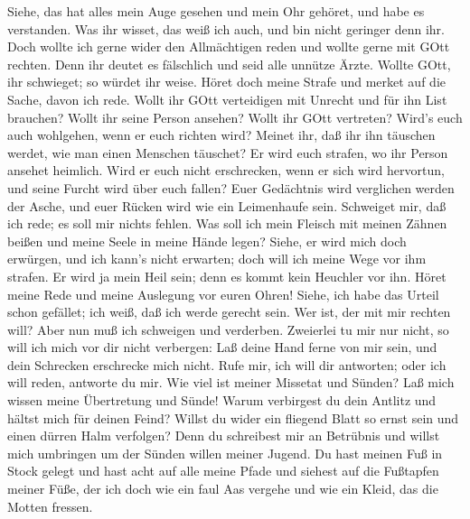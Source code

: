  Siehe, das hat alles mein Auge gesehen und mein Ohr
gehöret, und habe es verstanden.  Was ihr wisset, das weiß
ich auch, und bin nicht geringer denn ihr.  Doch wollte ich
gerne wider den Allmächtigen reden und wollte gerne mit GOtt rechten.
 Denn ihr deutet es fälschlich und seid alle unnütze Ärzte.
 Wollte GOtt, ihr schwieget; so würdet ihr weise.
 Höret doch meine Strafe und merket auf die Sache, davon ich
rede.  Wollt ihr GOtt verteidigen mit Unrecht und für ihn
List brauchen?  Wollt ihr seine Person ansehen? Wollt ihr
GOtt vertreten?  Wird's euch auch wohlgehen, wenn er euch
richten wird? Meinet ihr, daß ihr ihn täuschen werdet, wie man einen
Menschen täuschet?  Er wird euch strafen, wo ihr Person
ansehet heimlich.  Wird er euch nicht erschrecken, wenn er
sich wird hervortun, und seine Furcht wird über euch fallen?
 Euer Gedächtnis wird verglichen werden der Asche, und euer
Rücken wird wie ein Leimenhaufe sein.  Schweiget mir, daß
ich rede; es soll mir nichts fehlen.  Was soll ich mein
Fleisch mit meinen Zähnen beißen und meine Seele in meine Hände legen?
 Siehe, er wird mich doch erwürgen, und ich kann's nicht
erwarten; doch will ich meine Wege vor ihm strafen.  Er
wird ja mein Heil sein; denn es kommt kein Heuchler vor ihn.
 Höret meine Rede und meine Auslegung vor euren Ohren!
 Siehe, ich habe das Urteil schon gefället; ich weiß, daß
ich werde gerecht sein.  Wer ist, der mit mir rechten will?
Aber nun muß ich schweigen und verderben.  Zweierlei tu mir
nur nicht, so will ich mich vor dir nicht verbergen:  Laß
deine Hand ferne von mir sein, und dein Schrecken erschrecke mich nicht.
 Rufe mir, ich will dir antworten; oder ich will reden,
antworte du mir.  Wie viel ist meiner Missetat und Sünden?
Laß mich wissen meine Übertretung und Sünde!  Warum
verbirgest du dein Antlitz und hältst mich für deinen Feind?
 Willst du wider ein fliegend Blatt so ernst sein und einen
dürren Halm verfolgen?  Denn du schreibest mir an Betrübnis
und willst mich umbringen um der Sünden willen meiner Jugend.
 Du hast meinen Fuß in Stock gelegt und hast acht auf alle
meine Pfade und siehest auf die Fußtapfen meiner Füße,  der
ich doch wie ein faul Aas vergehe und wie ein Kleid, das die Motten
fressen.

